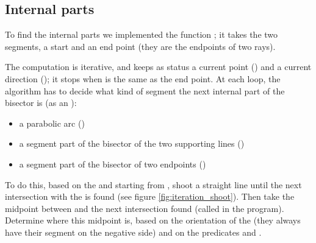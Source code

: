 \documentclass[11pt,a4paper,english]{article}
\begin{document}
	\subsection{Internal parts}
	To find the internal parts we implemented the function ; it takes the two segments, a start and an end point (they are the endpoints of two rays).\par
	The computation is iterative, and keeps as status a current point () and a current direction (); it stops when  is the same as the end point.
	At each loop, the algorithm has to decide what kind of segment the next internal part of the bisector is (as an ):
	\begin{itemize}[label=\(\triangleright\)]\setlength{\itemsep}{-2pt}
	\item a parabolic arc \hfill()
	\item a segment part of the bisector of the two supporting lines \hfill()
	\item a segment part of the bisector of two endpoints \hfill()
	\end{itemize}
	To do this, based on the  and starting from , shoot a straight line until the next intersection with the  is found (see figure \ref{fig:iteration_shoot}). Then take the midpoint between  and the next intersection found (called  in the program). Determine where this midpoint is, based on the orientation of the  (they always have their segment on the negative side) and on the predicates  and .
	
\end{document}
